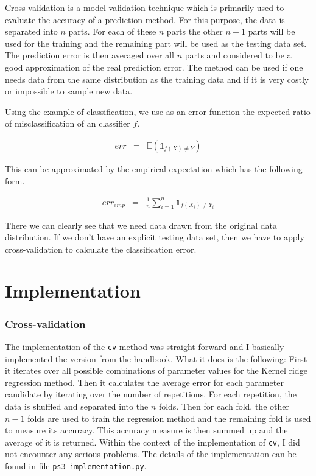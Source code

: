 \documentclass[a4paper, 11pt, titlepage]{article}
\begin{document}
Cross-validation is a model validation technique which is primarily used to evaluate the accuracy of a prediction method.
For this purpose, the data is separated into $n$ parts.
For each of these $n$ parts the other $n-1$ parts will be used for the training and the remaining part will be used as the testing data set.
The prediction error is then averaged over all $n$ parts and considered to be a good approximation of the real prediction error.
The method can be used if one needs data from the same distribution as the training data and if it is very costly or impossible to sample new data.

Using the example of classification, we use as an error function the expected ratio of misclassification of an classifier $f$.

\begin{eqnarray*}
	err &=& \mathbb{E}\left(\mathds{1}_{f(X) \not = Y}\right)
\end{eqnarray*}

This can be approximated by the empirical expectation which has the following form.

\begin{eqnarray*}
	err_{emp} &=& \frac{1}{n} \sum_{i=1}^n \mathds{1}_{f(X_i) \not = Y_i}
\end{eqnarray*}

There we can clearly see that we need data drawn from the original data distribution.
If we don't have an explicit testing data set, then we have to apply cross-validation to calculate the classification error.


\part{Implementation}
\label{part:implementation}

\section{Cross-validation}

The implementation of the \texttt{cv} method was straight forward and I basically implemented the version from the handbook.
What it does is the following:
First it iterates over all possible combinations of parameter values for the Kernel ridge regression method.
Then it calculates the average error for each parameter candidate by iterating over the number of repetitions.
For each repetition, the data is shuffled and separated into the $n$ folds.
Then for each fold, the other $n-1$ folds are used to train the regression method and the remaining fold is used to measure its accuracy.
This accuracy measure is then summed up and the average of it is returned.
Within the context of the implementation of \texttt{cv}, I did not encounter any serious problems.
The details of the implementation can be found in file \texttt{ps3\_implementation.py}.
\end{document}
